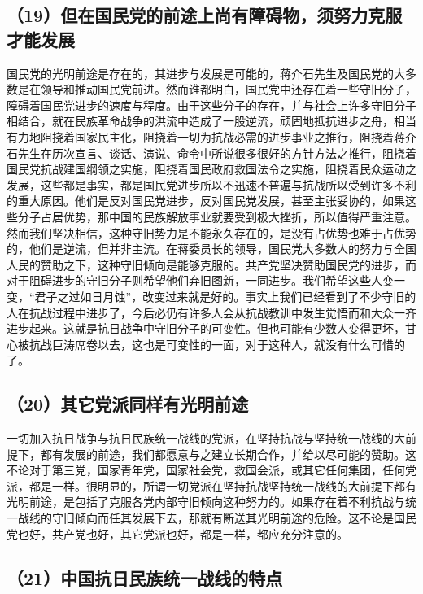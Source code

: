 \subsection{（19）但在国民党的前途上尚有障碍物，须努力克服才能发展}

国民党的光明前途是存在的，其进步与发展是可能的，蒋介石先生及国民党的大多数是在领导和推动国民党前进。然而谁都明白，国民党中还存在着一些守旧分子，障碍着国民党进步的速度与程度。由于这些分子的存在，并与社会上许多守旧分子相结合，就在民族革命战争的洪流中造成了一股逆流，顽固地抵抗进步之舟，相当有力地阻挠着国家民主化，阻挠着一切为抗战必需的进步事业之推行，阻挠着蒋介石先生在历次宣言、谈话、演说、命令中所说很多很好的方针方法之推行，阻挠着国民党抗战建国纲领之实施，阻挠着国民政府救国法令之实施，阻挠着民众运动之发展，这些都是事实，都是国民党进步所以不迅速不普遍与抗战所以受到许多不利的重大原因。他们是反对国民党进步，反对国民党发展，甚至主张妥协的，如果这些分子占居优势，那中国的民族解放事业就要受到极大挫折，所以值得严重注意。然而我们坚决相信，这种守旧势力是不能永久存在的，是没有占优势也难于占优势的，他们是逆流，但并非主流。在蒋委员长的领导，国民党大多数人的努力与全国人民的赞助之下，这种守旧倾向是能够克服的。共产党坚决赞助国民党的进步，而对于阻碍进步的守旧分子则希望他们弃旧图新，一同进步。我们希望这些人变一变，“君子之过如日月蚀”，改变过来就是好的。事实上我们已经看到了不少守旧的人在抗战过程中进步了，今后必仍有许多人会从抗战教训中发生觉悟而和大众一齐进步起来。这就是抗日战争中守旧分子的可变性。但也可能有少数人变得更坏，甘心被抗战巨涛席卷以去，这也是可变性的一面，对于这种人，就没有什么可惜的了。

\subsection{（20）其它党派同样有光明前途}

一切加入抗日战争与抗日民族统一战线的党派，在坚持抗战与坚持统一战线的大前提下，都有发展的前途，我们都愿意与之建立长期合作，并给以尽可能的赞助。这不论对于第三党，国家青年党，国家社会党，救国会派，或其它任何集团，任何党派，都是一样。很明显的，所谓一切党派在坚持抗战坚持统一战线的大前提下都有光明前途，是包括了克服各党内部守旧倾向这种努力的。如果存在着不利抗战与统一战线的守旧倾向而任其发展下去，那就有断送其光明前途的危险。这不论是国民党也好，共产党也好，其它党派也好，都是一样，都应充分注意的。

\subsection{（21）中国抗日民族统一战线的特点}

